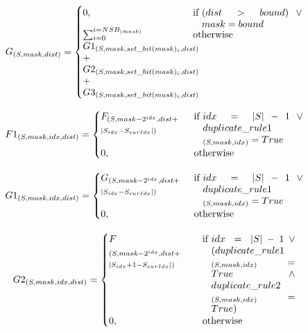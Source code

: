 \documentclass[a4paper]{IEEEtran}
\begin{document}
\begin{equation}
G_{(S,mask,dist)}= 
\begin{cases}
0,& \text{if }  \parbox[t]{0.3\linewidth} {$ (dist > bound) \vee mask = bound$} \\
\parbox[t]{0.3\linewidth}{$ \sum_{i=0}^{i=NSB_{(mask)}} \\G1_{(S, mask,
		set\_bit(mask)_{i}, dist)}\\+G2_{(S, mask,
		set\_bit(mask)_{i}, dist)}\\+G3_{(S, mask,
		set\_bit(mask)_{i}, dist)} $}& \text{otherwise}
\end{cases}
\label{equation:rekurens_g}
\end{equation}

\begin{equation*}
F1_{(S,mask,idx,dist)}= 
\begin{cases}
\parbox[t]{0.25\linewidth}{$ F_{(S, mask - 2^{idx}, dist +}\\_{|S_{idx} - S_{curIdx}|)} $}& \text{if } \parbox[t]{0.3\linewidth}{$idx = |S| - 1 \vee duplicate\_rule1\\_{(S, mask, idx)} = True$}\\
0,& \text{otherwise}
\end{cases}
\end{equation*}

\begin{equation*}
G1_{(S,mask,idx,dist)}= 
\begin{cases}
\parbox[t]{0.25\linewidth}{$ G_{(S, mask - 2^{idx}, dist +}\\_{|S_{idx} - S_{curIdx}|)} $}& \text{if } \parbox[t]{0.3\linewidth}{$idx=|S|-1 \vee duplicate\_rule1\\_{(S, mask, idx)} = True$}\\
0,& \text{otherwise}
\end{cases}
\end{equation*}

\begin{equation*}
G2_{(S,mask,idx, dist)}= 
\begin{cases}
\parbox[t]{0.25\linewidth}{$ F\\_{(S, mask - 2^{idx}, dist +}\\_{|S_{idx}+1 - S_{curIdx}|)} $}& \text{if } \parbox[t]{0.25\linewidth}{$idx=|S|-1 \vee (duplicate\_rule1\\_{(S, mask, idx)} = True \wedge duplicate\_rule2\\_{(S, mask, idx)} = True)$}\\
0,& \text{otherwise}
\end{cases}
\end{equation*}
\end{document}
